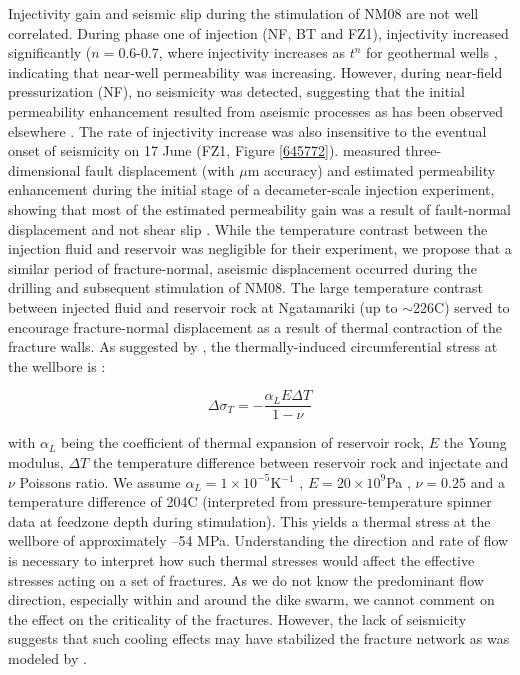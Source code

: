 Injectivity gain and seismic slip during the stimulation of NM08 are not well correlated. During phase one of injection (NF, BT and FZ1), injectivity increased significantly ($n=$0.6-0.7, where injectivity increases as $t^n$ for geothermal wells \citep{Clearwater_2015,grant2013thermal}, indicating that near-well permeability was increasing. However, during near-field pressurization (NF), no seismicity was detected, suggesting that the initial permeability enhancement resulted from aseismic processes as has been observed elsewhere \citep[][and references therein]{Cornet_2016}. The rate of injectivity increase was also insensitive to the eventual onset of seismicity on 17 June (FZ1, Figure \ref{645772}). \citet{Guglielmi_2015} measured three-dimensional fault displacement (with $\mu$m accuracy) and estimated permeability enhancement during the initial stage of a decameter-scale injection experiment, showing that most of the estimated permeability gain was a result of fault-normal displacement and not shear slip \citep{Guglielmi_2015}. While the temperature contrast between the injection fluid and reservoir was negligible for their experiment, we propose that a similar period of fracture-normal, aseismic displacement occurred during the drilling and subsequent stimulation of NM08. The large temperature contrast between injected fluid and reservoir rock at Ngatamariki (up to $\sim$226\textdegree C) served to encourage fracture-normal displacement as a result of thermal contraction of the fracture walls. As suggested by \citet{stephens1982hydraulic}, the thermally-induced circumferential stress at the wellbore is \cite{zoback2010}:

\begin{equation}
\Delta\sigma_{T} = -\frac{\alpha_{L}E\Delta{T}}{1 - \nu}
\end{equation}

with $\alpha_{L}$ being the coefficient of thermal expansion of reservoir rock, $E$ the Young modulus, $\Delta{T}$ the temperature difference between reservoir rock and injectate and $\nu$ Poissons ratio. We assume $\alpha_{L}=1\times10^{-5}$K$^{-1}$ \citep{Bauer_1983}, $E = 20\times10^{9}$Pa \citep{Cant_2018}, $\nu = 0.25$ and a temperature difference of 204\textdegree C (interpreted from pressure-temperature spinner data at feedzone depth during stimulation). This yields a thermal stress at the wellbore of approximately --54 MPa. Understanding the direction and rate of flow is necessary to interpret how such thermal stresses would affect the effective stresses acting on a set of fractures. As we do not know the predominant flow direction, especially within and around the dike swarm, we cannot comment on the effect on the criticality of the fractures. However, the lack of seismicity suggests that such cooling effects may have stabilized the fracture network as was modeled by \citet{Jeanne_2015tensor}.

